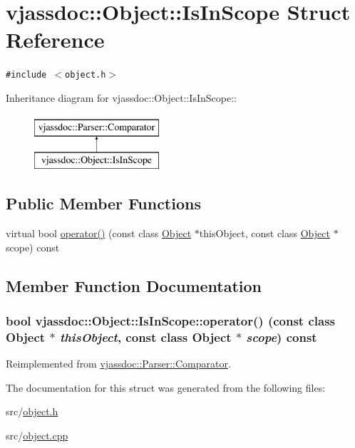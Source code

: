 \hypertarget{structvjassdoc_1_1Object_1_1IsInScope}{
\section{vjassdoc::Object::IsInScope Struct Reference}
\label{structvjassdoc_1_1Object_1_1IsInScope}
}
{\tt \#include $<$object.h$>$}

Inheritance diagram for vjassdoc::Object::IsInScope::\begin{figure}[H]
\begin{center}
\leavevmode
\includegraphics[height=2cm]{structvjassdoc_1_1Object_1_1IsInScope}
\end{center}
\end{figure}
\subsection*{Public Member Functions}
\begin{CompactItemize}
\item 
virtual bool \hyperlink{structvjassdoc_1_1Object_1_1IsInScope_319d4736b3b35681570cc5be477dc5c9}{operator()} (const class \hyperlink{classvjassdoc_1_1Object}{Object} $\ast$thisObject, const class \hyperlink{classvjassdoc_1_1Object}{Object} $\ast$scope) const 
\end{CompactItemize}


\subsection{Member Function Documentation}
\hypertarget{structvjassdoc_1_1Object_1_1IsInScope_319d4736b3b35681570cc5be477dc5c9}{
\subsubsection{\setlength{\rightskip}{0pt plus 5cm}bool vjassdoc::Object::IsInScope::operator() (const class {\bf Object} $\ast$ {\em thisObject}, const class {\bf Object} $\ast$ {\em scope}) const}}
\label{structvjassdoc_1_1Object_1_1IsInScope_319d4736b3b35681570cc5be477dc5c9}




Reimplemented from \hyperlink{structvjassdoc_1_1Parser_1_1Comparator_c27d6790182d87751bcf134a0d01481a}{vjassdoc::Parser::Comparator}.

The documentation for this struct was generated from the following files:\begin{CompactItemize}
\item 
src/\hyperlink{object_8h}{object.h}\item 
src/\hyperlink{object_8cpp}{object.cpp}\end{CompactItemize}
